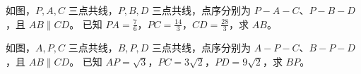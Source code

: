 \documentclass{exam-zh}
\begin{document}

\begin{problem}[points=10]
  \noindent
  \begin{minipage}[t]{\dimexpr\linewidth-60mm-6mm\relax}
    \vspace{0pt}
    如图，$P,A,C$ 三点共线，$P,B,D$ 三点共线，点序分别为 $P-A-C$、$P-B-D$，且 $AB\parallel CD$。
已知 $PA=\frac{7}{6}$，$PC=\frac{14}{3}$，$CD=\frac{28}{3}$，求 $AB$。
    
  \end{minipage}\hfill
  \begin{diagramcoltikz}{60mm}{先看平行边方向，再判断 A 字型或 8 字型及对应边。}
  }
  \end{diagramcoltikz}
  \par\medskip
  \answerarea[42mm]
\end{problem}



\begin{problem}[points=10]
  \noindent
  \begin{minipage}[t]{\dimexpr\linewidth-60mm-6mm\relax}
    \vspace{0pt}
    如图，$A,P,C$ 三点共线，$B,P,D$ 三点共线，点序分别为 $A-P-C$、$B-P-D$，且 $AB\parallel CD$。
已知 $AP=\sqrt{3}$，$PC=3\sqrt{2}$，$PD=9\sqrt{2}$，求 $BP$。
    
  \end{minipage}\hfill
  \begin{diagramcoltikz}{60mm}{先看平行边方向，再判断 A 字型或 8 字型及对应边。}
  }
  \end{diagramcoltikz}
  \par\medskip
  \answerarea[42mm]
\end{problem}
\end{document}
